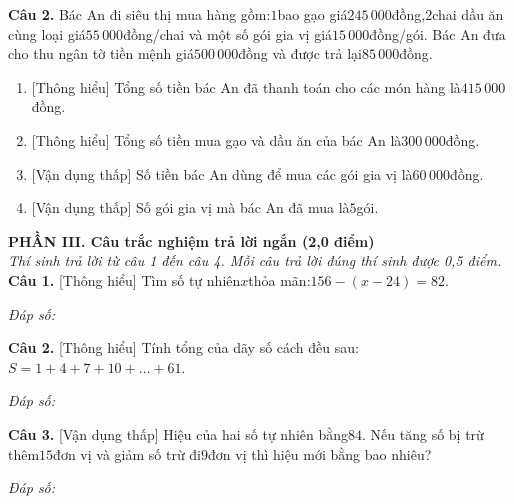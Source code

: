 \documentclass[11pt,a4paper]{article}
\begin{document}
\noindent\textbf{Câu 2.} Bác An đi siêu thị mua hàng gồm:$1$bao gạo giá$245\,000$đồng,$2$chai dầu ăn cùng loại giá$55\,000$đồng/chai và một số gói gia vị giá$15\,000$đồng/gói. Bác An đưa cho thu ngân tờ tiền mệnh giá$500\,000$đồng và được trả lại$85\,000$đồng.\par\vspace{2pt}
\begin{enumerate}[label=\textbf{\alph*)}, leftmargin=1.2cm, itemsep=2pt, topsep=2pt]
  \item \textnormal{[Thông hiểu]} Tổng số tiền bác An đã thanh toán cho các món hàng là$415\,000$đồng.
  \item \textnormal{[Thông hiểu]} Tổng số tiền mua gạo và dầu ăn của bác An là$300\,000$đồng.
  \item \textnormal{[Vận dụng thấp]} Số tiền bác An dùng để mua các gói gia vị là$60\,000$đồng.
  \item \textnormal{[Vận dụng thấp]} Số gói gia vị mà bác An đã mua là$5$gói.
\end{enumerate}
\vspace{6pt}


\vspace{6pt}
\noindent
\textbf{\large PHẦN III. Câu trắc nghiệm trả lời ngắn (2,0 điểm)}\\
\textit{\small Thí sinh trả lời từ câu 1 đến câu 4. Mỗi câu trả lời đúng thí sinh được 0,5 điểm.}
\vspace{6pt}
\noindent\textbf{Câu 1.} [Thông hiểu] Tìm số tự nhiên$x$thỏa mãn:$156 - (x - 24) = 82$.\par\vspace{2pt}
\noindent\textit{Đáp số:} \dotfill\par\vspace{6pt}

\noindent\textbf{Câu 2.} [Thông hiểu] Tính tổng của dãy số cách đều sau:$S = 1 + 4 + 7 + 10 + \dots + 61$.\par\vspace{2pt}
\noindent\textit{Đáp số:} \dotfill\par\vspace{6pt}

\noindent\textbf{Câu 3.} [Vận dụng thấp] Hiệu của hai số tự nhiên bằng$84$. Nếu tăng số bị trừ thêm$15$đơn vị và giảm số trừ đi$9$đơn vị thì hiệu mới bằng bao nhiêu?\par\vspace{2pt}
\noindent\textit{Đáp số:} \dotfill\par\vspace{6pt}
\end{document}
